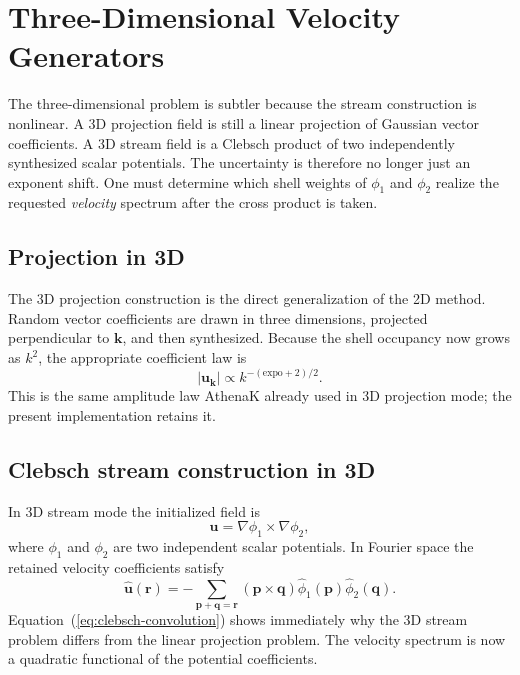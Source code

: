 \documentclass[twocolumn]{aastex7}
\begin{document}
\section{Three-Dimensional Velocity Generators}
\label{sec:3d}
The three-dimensional problem is subtler because the stream construction is nonlinear. A 3D projection field is still a linear projection of Gaussian vector coefficients. A 3D stream field is a Clebsch product of two independently synthesized scalar potentials. The uncertainty is therefore no longer just an exponent shift. One must determine which shell weights of $\phi_1$ and $\phi_2$ realize the requested \emph{velocity} spectrum after the cross product is taken.

\subsection{Projection in 3D}
The 3D projection construction is the direct generalization of the 2D method. Random vector coefficients are drawn in three dimensions, projected perpendicular to $\mathbf{k}$, and then synthesized. Because the shell occupancy now grows as $k^2$, the appropriate coefficient law is
\begin{equation}
|\mathbf{u}_{\mathbf{k}}| \propto k^{-(\mathrm{expo}+2)/2}.
\label{eq:3d-projection-law}
\end{equation}
This is the same amplitude law AthenaK already used in 3D projection mode; the present implementation retains it.

\subsection{Clebsch stream construction in 3D}
In 3D stream mode the initialized field is
\begin{equation}
\mathbf{u} = \nabla \phi_1 \times \nabla \phi_2,
\label{eq:clebsch}
\end{equation}
where $\phi_1$ and $\phi_2$ are two independent scalar potentials. In Fourier space the retained velocity coefficients satisfy
\begin{equation}
\hat{\mathbf{u}}(\mathbf{r}) =
-\sum_{\mathbf{p}+\mathbf{q}=\mathbf{r}}
\left(\mathbf{p}\times\mathbf{q}\right)
\hat{\phi}_1(\mathbf{p})\hat{\phi}_2(\mathbf{q}).
\label{eq:clebsch-convolution}
\end{equation}
Equation~(\ref{eq:clebsch-convolution}) shows immediately why the 3D stream problem differs from the linear projection problem. The velocity spectrum is now a quadratic functional of the potential coefficients.
\end{document}
